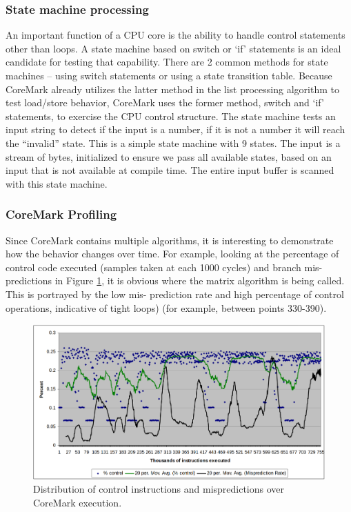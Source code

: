 \subsubsection{State machine processing}
An important function of a CPU core is the ability to handle control statements other than
loops. A state machine based on switch or ‘if’ statements is an ideal candidate for testing
that capability. There are 2 common methods for state machines – using switch
statements or using a state transition table. Because CoreMark already utilizes the latter
method in the list processing algorithm to test load/store behavior, CoreMark uses the
former method, switch and ‘if’ statements, to exercise the CPU control structure.
The state machine tests an input string to detect if the input is a number, if it is not a
number it will reach the “invalid” state. This is a simple state machine with 9 states. The
input is a stream of bytes, initialized to ensure we pass all available states, based on an
input that is not available at compile time. The entire input buffer is scanned with this
state machine.
\subsubsection{CoreMark Profiling}
Since CoreMark contains multiple algorithms, it is interesting to demonstrate how the
behavior changes over time. For example, looking at the percentage of control code
executed (samples taken at each 1000 cycles) and branch mis-predictions in Figure \ref{fig:coremark_control}, it is
obvious where the matrix algorithm is being called. This is portrayed by the low mis-
prediction rate and high percentage of control operations, indicative of tight loops) (for example,
between points 330-390).
\begin{figure}[H]
  \centering
  \includegraphics[width=15cm]{img/ST_Summer_Internship/coremark_control_instructions.png}
  \caption{Distribution of control instructions and mispredictions over CoreMark execution.}
  \label{fig:coremark_control}
\end{figure}

